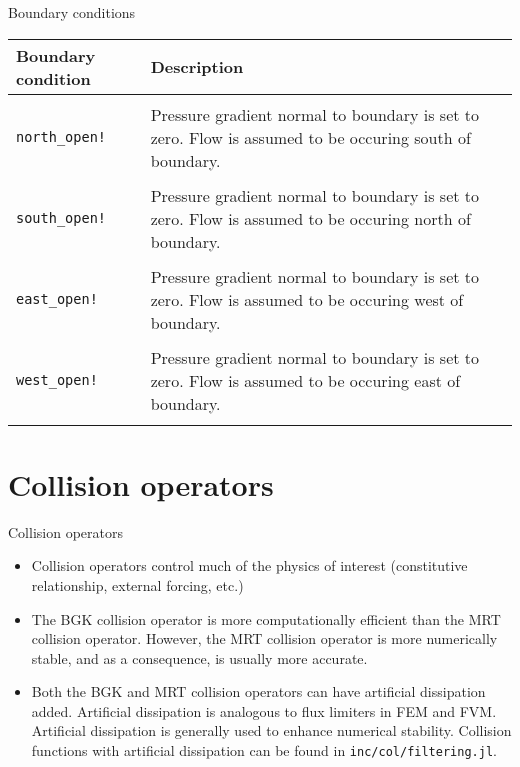 \documentclass[pdf]{beamer}
\begin{document}
\begin{frame}{Boundary conditions}
\begin{table}
    \tiny
    \centering
    \begin{tabularx}{\textwidth}{l X}
      \textbf{Boundary condition} & \textbf{Description} \\
      \hline \\
      \texttt{north\_open!} & Pressure gradient normal to boundary is set to zero. Flow is assumed to be occuring south of boundary. \\
      \\
      \texttt{south\_open!} & Pressure gradient normal to boundary is set to zero. Flow is assumed to be occuring north of boundary. \\
      \\
      \texttt{east\_open!} & Pressure gradient normal to boundary is set to zero. Flow is assumed to be occuring west of boundary. \\
      \\
      \texttt{west\_open!} & Pressure gradient normal to boundary is set to zero. Flow is assumed to be occuring east of boundary. \\
      \\
    \end{tabularx}
  \end{table}
\end{frame}

\section{Collision operators}

\begin{frame}{Collision operators}
  \begin{itemize}
    \item <1-> Collision operators control much of the physics of interest (constitutive relationship, external forcing, etc.)
    \item <2-> The BGK collision operator is more computationally efficient than the MRT collision operator. However, the MRT collision operator is more numerically stable, and as a consequence, is usually more accurate.
    \item <3-> Both the BGK and MRT collision operators can have artificial dissipation added. Artificial dissipation is analogous to flux limiters in FEM and FVM. Artificial dissipation is generally used to enhance numerical stability. Collision functions with artificial dissipation can be found in \texttt{inc/col/filtering.jl}.
  \end{itemize}
\end{frame}
\end{document}
